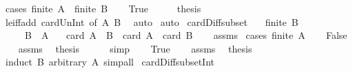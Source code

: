 \begin{isabellebody}
%
\isadelimproof
%
\endisadelimproof
%
\isatagproof
{}\isamarkupfalse%
\ {\isacharparenleft}{\kern0pt}cases\ {\isachardoublequoteopen}finite\ A\ {\isasymand}\ finite\ B{\isachardoublequoteclose}{\isacharparenright}{\kern0pt}\isanewline
\ \ \isamarkupfalse%
\ True\isanewline
\ \ \isamarkupfalse%
\ \isamarkupfalse%
\ {\isacharquery}{\kern0pt}thesis\isanewline
\ \ \ \ \isamarkupfalse%
\ le{\isacharunderscore}{\kern0pt}iff{\isacharunderscore}{\kern0pt}add\ card{\isacharunderscore}{\kern0pt}Un{\isacharunderscore}{\kern0pt}Int\ {\isacharbrackleft}{\kern0pt}of\ A\ B{\isacharbrackright}{\kern0pt}\ \isamarkupfalse%
\ auto\isanewline
{}\isamarkupfalse%
\ auto%
\endisatagproof
{\isafoldproof}%
%
\isadelimproof
\isanewline
%
\endisadelimproof
\isanewline
{}\isamarkupfalse%
\ card{\isacharunderscore}{\kern0pt}Diff{\isacharunderscore}{\kern0pt}subset{\isacharcolon}{\kern0pt}\isanewline
\ \ \ {\isachardoublequoteopen}finite\ B{\isachardoublequoteclose}\isanewline
\ \ \ \ \ {\isachardoublequoteopen}B\ {\isasymsubseteq}\ A{\isachardoublequoteclose}\isanewline
\ \ \ {\isachardoublequoteopen}card\ {\isacharparenleft}{\kern0pt}A\ {\isacharminus}{\kern0pt}\ B{\isacharparenright}{\kern0pt}\ {\isacharequal}{\kern0pt}\ card\ A\ {\isacharminus}{\kern0pt}\ card\ B{\isachardoublequoteclose}\isanewline
%
\isadelimproof
\ \ %
\endisadelimproof
%
\isatagproof
{}\isamarkupfalse%
\ assms\isanewline
{}\isamarkupfalse%
\ {\isacharparenleft}{\kern0pt}cases\ {\isachardoublequoteopen}finite\ A{\isachardoublequoteclose}{\isacharparenright}{\kern0pt}\isanewline
\ \ \isamarkupfalse%
\ False\isanewline
\ \ \isamarkupfalse%
\ assms\ \isamarkupfalse%
\ {\isacharquery}{\kern0pt}thesis\isanewline
\ \ \ \ \isamarkupfalse%
\ simp\isanewline
{}\isamarkupfalse%
\isanewline
\ \ \isamarkupfalse%
\ True\isanewline
\ \ \isamarkupfalse%
\ assms\ \isamarkupfalse%
\ {\isacharquery}{\kern0pt}thesis\isanewline
\ \ \ \ \isamarkupfalse%
\ {\isacharparenleft}{\kern0pt}induct\ B\ arbitrary{\isacharcolon}{\kern0pt}\ A{\isacharparenright}{\kern0pt}\ simp{\isacharunderscore}{\kern0pt}all\isanewline
{}\isamarkupfalse%
%
\endisatagproof
{\isafoldproof}%
%
\isadelimproof
\isanewline
%
\endisadelimproof
\isanewline
{}\isamarkupfalse%
\ card{\isacharunderscore}{\kern0pt}Diff{\isacharunderscore}{\kern0pt}subset{\isacharunderscore}{\kern0pt}Int{\isacharcolon}{\kern0pt}\isanewline

\end{isabellebody}
